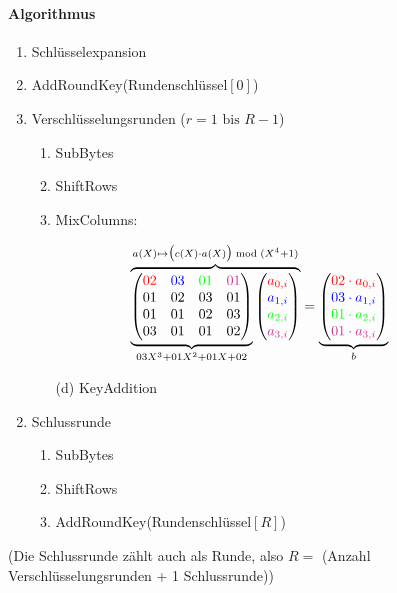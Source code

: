 \documentclass[8pt,a4paper,landscape]{article}
\begin{document}
\begin{multicols}{4}
\paragraph{Algorithmus}
\begin{enumerate}[itemsep=1pt]
    \item Schlüsselexpansion
    \item AddRoundKey(Rundenschlüssel$[0]$)
    \item Verschlüsselungsrunden ($r = 1 \text{ bis } R-1$)
          \begin{enumerate}[itemsep=1pt]
              \item SubBytes                    
              \item ShiftRows
              \item MixColumns:
             \end{enumerate}
\end{enumerate}         
\[
\overbrace{\underbrace{\begin{pmatrix}\textcolor{red}{02} & \textcolor{blue}{03} & \textcolor{green}{01} & \textcolor{Magenta}{01}\\ 01 & 02 & 03 & 01\\ 01 & 01 & 02 & 03\\ 03 & 01 &  01 & 02 \end{pmatrix}}_{ 03X^3 + 01X^2 + 01X + 02} \begin{pmatrix}\textcolor{red}{a_{0,i}} \\ \textcolor{blue}{a_{1,i}} \\ \textcolor{green}{a_{2,i}}\\ \textcolor{Magenta}{a_{3,i}} \end{pmatrix}}^{a(X) \mapsto \big( c(X) \cdot a(X) \big) \bmod (X^4 +1)} = \underbrace{\begin{pmatrix}\textcolor{red}{02 \cdot a_{0,i}} \\ \textcolor{blue}{03 \cdot a_{1,i}} \\ \textcolor{green}{01 \cdot a_{2,i}}\\ \textcolor{Magenta}{01 \cdot a_{3,i}} \end{pmatrix}}_{b}
\]
\begin{enumerate}[itemsep=1pt,resume]      
	\item[] \begin{enumerate}[itemsep=1pt]             
              \item[(d)] KeyAddition
          \end{enumerate}
    \item Schlussrunde
          \begin{enumerate}[itemsep=1pt]
              \item SubBytes
              \item ShiftRows
              \item AddRoundKey(Rundenschlüssel$[R]$)
          \end{enumerate}
\end{enumerate}
(Die Schlussrunde zählt auch als Runde, also $R =$ (Anzahl Verschlüsselungsrunden + 1 Schlussrunde))


\end{multicols}
\end{document}
